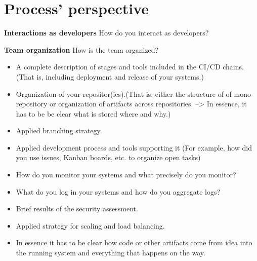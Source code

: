 \section{Process' perspective}

\textbf{Interactions as developers}\newline
 How do you interact as developers?\newline
 
\newline
\textbf{Team organization}\newline
  How is the team organized?\newline
  \begin{itemize}
  \item A complete description of stages and tools included in the CI/CD chains.(That is, including deployment and release of your systems.)
  \item Organization of your repositor(ies).(That is, either the structure of of mono-repository or organization of artifacts across repositories. --> In essence, it has to be be clear what is stored where and why.)
  \item Applied branching strategy.
  \item Applied development process and tools supporting it (For example, how did you use issues, Kanban boards, etc. to organize open tasks)
  \item How do you monitor your systems and what precisely do you monitor?
  \item What do you log in your systems and how do you aggregate logs?
  \item Brief results of the security assessment.
  \item Applied strategy for scaling and load balancing.
  \item In essence it has to be clear how code or other artifacts come from idea into the running system and everything that happens on the way.
  
\end{itemize}